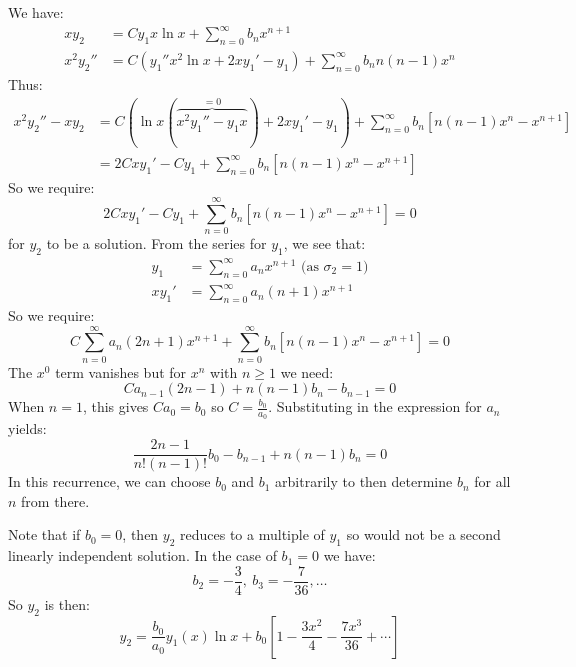 \documentclass[../main.tex]{subfiles}
\begin{document}
\begin{example}[Case 2]
  We have:
  \begin{align*}
    xy_2 &= Cy_1 x\ln x + \sum_{n=0}^{\infty} b_n x^{n + 1} \\
    x^2y_2'' &= C(y_1'' x^2 \ln x + 2xy_1' - y_1) + \sum_{n=0}^{\infty} b_nn(n-1)x^{n}
  \end{align*}
  Thus:
  \begin{align*}
    x^2y_2'' - xy_2 &= C(\ln x (\overbrace{x^2 y_1'' -y_1x}^{=0}) + 2xy_1' - y_1) + \sum_{n=0}^{\infty} b_n[n(n-1)x^{n} - x^{n + 1}] \\
                    &= 2Cxy_1' - Cy_1 + \sum_{n=0}^{\infty} b_n[n(n-1)x^{n} - x^{n + 1}]
  \end{align*}
  So we require:
  \[
    2Cxy_1' - Cy_1 + \sum_{n=0}^{\infty} b_n[n(n-1)x^{n} - x^{n + 1}] = 0
  \]
  for $y_2$ to be a solution.
  From the series for $y_1$, we see that:
  \begin{align*}
    y_1 &= \sum_{n=0}^{\infty} a_n x^{n + 1} \text{ (as $\sigma_2 = 1$)} \\
    xy_1' &= \sum_{n=0}^{\infty} a_n(n + 1)x^{n + 1}
  \end{align*}
  So we require:
  \[
    C\sum_{n=0}^{\infty} a_n (2n + 1)x^{n + 1} + \sum_{n=0}^{\infty} b_n[n(n-1)x^{n} - x^{n + 1}] = 0
  \]
  The $x^{0}$ term vanishes but for $x^{n}$ with $n \geq 1$ we need:
  \[
    Ca_{n - 1}(2n - 1) + n(n - 1)b_n - b_{n - 1} = 0
  \]
  When $n = 1$, this gives $Ca_0 = b_0$ so $C = \frac{b_0}{a_0}$.
  Substituting in the expression for $a_n$ yields:
  \[
    \frac{2n - 1}{n!(n - 1)!}b_0 - b_{n - 1} +  n(n - 1)b_n = 0
  \]
  In this recurrence, we can choose $b_0$ and $b_1$ arbitrarily to then determine $b_n$ for all $n$ from there.

  Note that if $b_0 = 0$, then $y_2$ reduces to a multiple of $y_1$ so would not be a second linearly independent solution.
  In the case of $b_1 = 0$ we have:
  \[
    b_2 = -\frac{3}{4},\ b_3 = -\frac{7}{36}, \ldots
  \]
  So $y_2$ is then:
  \[
    y_2 = \frac{b_0}{a_0} y_1(x)\ln x + b_0\left[1 - \frac{3x^2}{4} - \frac{7x^3}{36} + \cdots\right]
  \]
\end{example}
\end{document}

